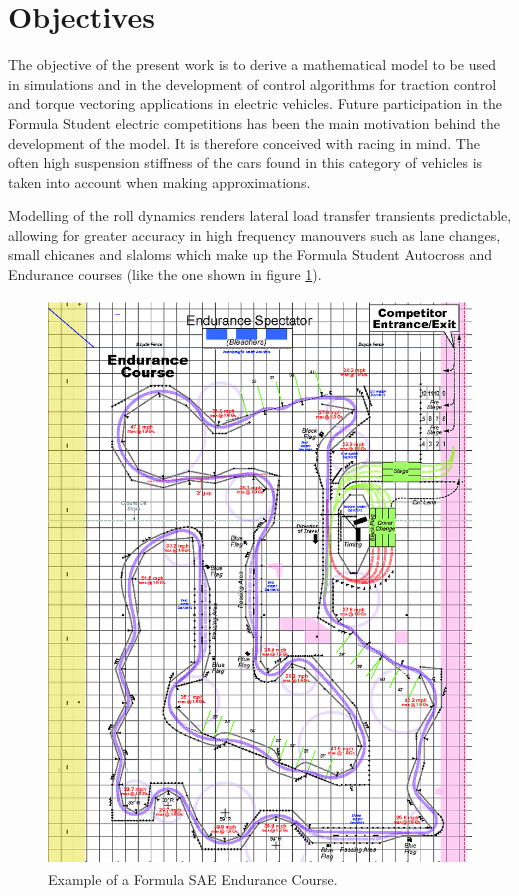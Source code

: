 \section{Objectives}
\label{sec:objectives}
The objective of the present work is to derive a mathematical model to be used  in simulations and in the development of control algorithms for traction control and torque vectoring applications in electric vehicles.
Future participation in the Formula Student electric competitions has been the main motivation behind the development of the model. It is therefore conceived with racing in mind. The often high suspension stiffness of the cars found in this category of vehicles is taken into account when making approximations.

Modelling of the roll dynamics renders lateral load transfer transients predictable, allowing for greater accuracy in high frequency manouvers such as lane changes, small chicanes and slaloms which make up the Formula Student Autocross and Endurance courses (like the one shown in figure \ref{autox}).


\begin{figure}[tb]
  \centering
  \includegraphics[height=15cm]{images/autox}
  \caption{Example of a Formula SAE Endurance Course.}
  \label{autox}
\end{figure}


